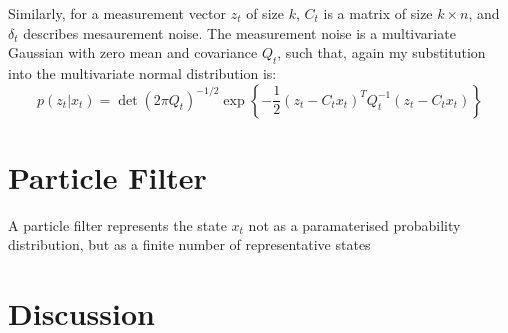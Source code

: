 \documentclass[english]{article}
\begin{document}
Similarly, for a measurement vector $z_t$ of size $k$, $C_t$ is a matrix of size $k \times n$, and $\delta_t$ describes mesaurement noise. The measurement noise is a multivariate Gaussian with zero mean and covariance $Q_t$, such that, again my substitution into the multivariate normal distribution is:
\begin{equation}
	p(z_t | x_t) = \det(2 \pi Q_t)^{-1/2} \exp\left\{-\frac{1}{2}(z_t - C_t x_t)^T Q_t^{-1}(z_t - C_t x_t)\right\}
\end{equation}


\section*{Particle Filter}

A particle filter represents the state $x_t$ not as a paramaterised probability distribution, but as a finite number of representative states



\section*{Discussion}
\end{document}
